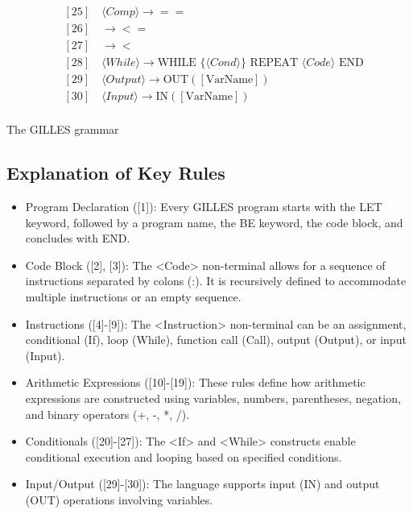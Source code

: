 \documentclass{article}
\begin{document}
\begin{align*}
		&[25] \quad \langle Comp \rangle \rightarrow == \\
		&[26] \quad \rightarrow <= \\
		&[27] \quad \rightarrow < \\
		&[28] \quad \langle While \rangle \rightarrow \text{WHILE } \{ \langle Cond \rangle \} \text{ REPEAT } \langle Code \rangle \text{ END} \\
		&[29] \quad \langle Output \rangle \rightarrow \text{OUT}([\text{VarName}]) \\
		&[30] \quad \langle Input \rangle \rightarrow \text{IN}([\text{VarName}]) \\
	\end{align*}

	\begin{table}[h]
		\centering
		\caption{The GILLES grammar}
	\end{table}

	\subsection{Explanation of Key Rules}

	\begin{itemize}
	\item Program Declaration ([1]): Every GILLES program starts with the LET keyword, followed by a program name, the BE keyword, the code block, and concludes with END.
	\item Code Block ([2], [3]): The <Code> non-terminal allows for a sequence of instructions separated by colons (:). It is recursively defined to accommodate multiple instructions or an empty sequence.
	\item Instructions ([4]-[9]): The <Instruction> non-terminal can be an assignment, conditional (If), loop (While), function call (Call), output (Output), or input (Input).
	\item Arithmetic Expressions ([10]-[19]): These rules define how arithmetic expressions are constructed using variables, numbers, parentheses, negation, and binary operators (+, -, *, /).
	\item Conditionals ([20]-[27]): The <If> and <While> constructs enable conditional execution and looping based on specified conditions.
	\item Input/Output ([29]-[30]): The language supports input (IN) and output (OUT) operations involving variables.
	\end{itemize}
\end{document}
